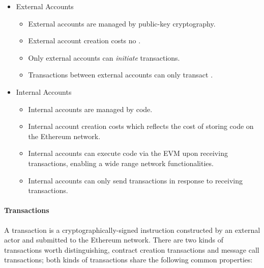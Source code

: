 \begin{itemize}[label=]
  \item External Accounts
    \begin{itemize}[label=$\bullet$]
      \item External accounts are managed by public-key cryptography.
      \item External account creation costs no .
      \item Only external accounts can \emph{initiate} transactions.
      \item Transactions between external accounts can only transact
        .
    \end{itemize}
  \item Internal Accounts
    \begin{itemize}[label=$\bullet$]
      \item Internal accounts are managed by code.
      \item Internal account creation costs  which reflects the cost
        of storing code on the Ethereum network.
      \item Internal accounts can execute code via the EVM upon receiving
        transactions, enabling a wide range network functionalities.
      \item Internal accounts can only send transactions in response to
        receiving transactions. 
    \end{itemize}
\end{itemize}

\paragraph{Transactions}
A transaction is a cryptographically-signed instruction constructed by an
external actor and submitted to the Ethereum network. There are two kinds of
transactions worth distinguishing, contract creation transactions and message
call transactions; both kinds of transactions share the following common
properties:

